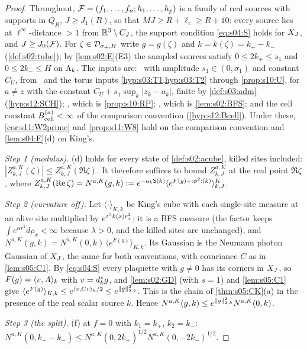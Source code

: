 \begin{proof}
Throughout, $\mathcal F=(f_1,\dots,f_n;h_1,\dots,h_p)$ is a family of real sources with supports in $Q_R$, $J\ge J_1(R)$, so that $MJ\ge R+\ell_c\ge R+10$: every source lies at $\ell^\infty$-distance $>1$ from $\mathbb R^3\setminus C_J$, the support condition \eqref{eq:s04:S} holds for $X_J$, and $J\ge J_0(\mathcal F)$. For $\zeta\in\mathcal D_{\sigma_+,H}$ write $g=g(\zeta)$ and $k=k(\zeta)=k_+-k_-$ (\cref{def:s02:tube}); by \cref{lem:s02:E}(E3) the sampled sources satisfy $0\le2k_+\le s_1$ and $0\le2k_-\le H$ on $\Lambda_k$. The inputs are: \Itwo\ with amplitude $s_1\in(0,\sigma_1)$ and constant $C_U$, from \Tthree\ and the torus inputs \cref{hyp:s03:T1,hyp:s03:T2} through \cref{prop:s10:U}, for $a\ne z$ with the constant $C_U+s_1\sup_k|z_k-a_k|$, finite by \cref{def:s03:adm} (\cref{hyp:s12:SCH}); \Ithree, which is \cref{prop:s10:RP}; \Ifour, which is \cref{lem:s02:BFS}; and the cell constant $B^{(a)}_{\rm cell}<\infty$ of the comparison convention (\cref{hyp:s12:Bcell}). Under these, \cref{cor:s11:W2prime} and \cref{prop:s11:W8} hold on the comparison convention and \cref{lem:s04:E}(d) on King's.

\emph{Step 1 (modulus).} (d) holds for every state of \cref{def:s02:acube}, killed sites included: $|Z^{a,K}_{k,J}(\zeta)|\le Z^{a,K}_{k,J}(\Re\zeta)$. It therefore suffices to bound $Z^{a,K}_{k,J}$ at the real point $\Re\zeta$, where $Z^{a,K}_{k,J}(\operatorname{Re}\zeta)=N^{a,K}(g,k):= e^{-a_k\mathsf S(k)}\langle e^{F(g)+{:}\phi^2{:}(k)}\rangle^{K}_{k,J}$.

\emph{Step 2 (curvature off).} Let $\langle\cdot\rangle_{K,k}$ be King's cube with each single-site measure at an alive site multiplied by $e^{\varepsilon^3k(x)r_x^2}$; it is a BFS measure (the factor keeps $\int e^{\alpha r^2}d\rho_x<\infty$ because $\lambda>0$, and the killed sites are unchanged), and $N^{a,K}(g,k)=N^{a,K}(0,k)\,\langle e^{F(g)}\rangle_{K,k}$. Its Gaussian is the Neumann photon Gaussian of $X_J$, the same for both conventions, with covariance $C$ as in \cref{lem:s05:C1}. By \eqref{eq:s04:S} every plaquette with $g\ne0$ has its corners in $X_J$, so $F(g)=\langle v,A\rangle_k$ with $v=d^{*}_kg$, and \cref{lem:s02:GD} (with $s=1$) and \cref{lem:s05:C1} give $\langle e^{F(g)}\rangle_{K,k}\le e^{\langle v,Cv\rangle_k/2}\le e^{\lVert g\rVert_{2,k}^2}$. This is the chain of \cref{thm:s05:CK}(a) in the presence of the real scalar source $k$. Hence $N^{a,K}(g,k)\le e^{\lVert g\rVert_{2,k}^2}N^{a,K}(0,k)$.

\emph{Step 3 (the split).} (f) at $f=0$ with $k_1=k_+$, $k_2=k_-$: $N^{a,K}(0,k_+-k_-)\le N^{a,K}(0,2k_+)^{1/2}N^{a,K}(0,-2k_-)^{1/2}$.


\end{proof}
